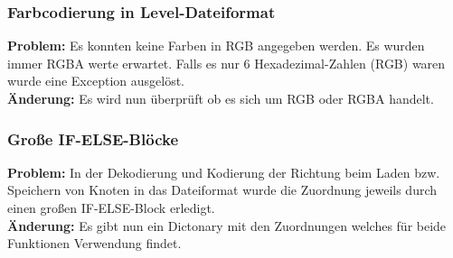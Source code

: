 \subsubsection*{Farbcodierung in Level-Dateiformat}
\textbf{Problem:}
Es konnten keine Farben in RGB angegeben werden. Es wurden immer RGBA werte erwartet.
Falls es nur 6 Hexadezimal-Zahlen (RGB) waren wurde eine Exception ausgelöst.
\\
\textbf{Änderung:} Es wird nun überprüft ob es sich um RGB oder RGBA handelt.

\subsubsection*{Große IF-ELSE-Blöcke}
\textbf{Problem:}
In der Dekodierung und Kodierung der Richtung beim Laden bzw. Speichern von Knoten in das Dateiformat wurde die Zuordnung jeweils durch einen großen IF-ELSE-Block erledigt.
\\
\textbf{Änderung:} Es gibt nun ein Dictonary mit den Zuordnungen welches für beide Funktionen Verwendung findet.









